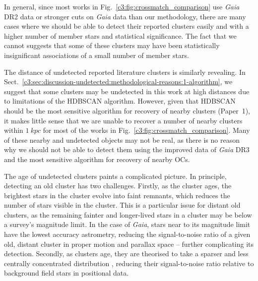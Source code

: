 In general, since most works in Fig.~\ref{c3:fig:crossmatch_comparison} use \emph{Gaia} DR2 data or stronger cuts on \emph{Gaia} data than our methodology, there are many cases where we should be able to detect their reported clusters easily and with a higher number of member stars and statistical significance. The fact that we cannot suggests that some of these clusters may have been statistically insignificant associations of a small number of member stars.


The distance of undetected reported literature clusters is similarly revealing. In Sect.~\ref{c3:sec:discussion-undetected:methodological-reasons:1-algorithm}, we suggest that some clusters may be undetected in this work at high distances due to limitations of the HDBSCAN algorithm. However, given that HDBSCAN should be the most sensitive algorithm for recovery of nearby clusters (Paper~1), it makes little sense that we are unable to recover a number of nearby clusters within $1~kpc$ for most of the works in Fig.~\ref{c3:fig:crossmatch_comparison}. Many of these nearby and undetected objects may not be real, as there is no reason why we should not be able to detect them using the improved data of \emph{Gaia} DR3 and the most sensitive algorithm for recovery of nearby OCs.


The age of undetected clusters paints a complicated picture. In principle, detecting an old cluster has two challenges. Firstly, as the cluster ages, the brightest stars in the cluster evolve into faint remnants, which reduces the number of stars visible in the cluster. This is a particular issue for distant old clusters, as the remaining fainter and longer-lived stars in a cluster may be below a survey's magnitude limit. In the case of \emph{Gaia}, stars near to its magnitude limit have the lowest accuracy astrometry, reducing the signal-to-noise ratio of a given old, distant cluster in proper motion and parallax space -- further complicating its detection. Secondly, as clusters age, they are theorised to take a sparser and less centrally concentrated distribution \citep{portegies_zwart_young_2010}, reducing their signal-to-noise ratio relative to background field stars in positional data.

